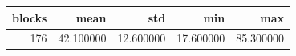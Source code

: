 \begin{tabular}{rrrrr}
\toprule
blocks & mean & std & min & max \\
\midrule
176 & 42.100000 & 12.600000 & 17.600000 & 85.300000 \\
\bottomrule
\end{tabular}
